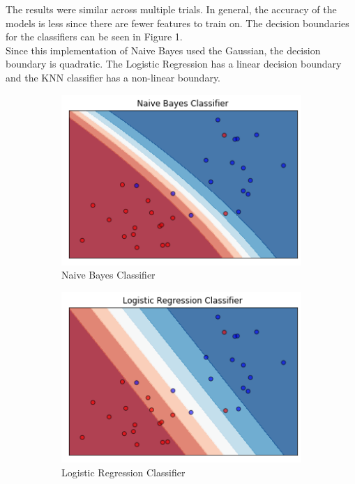 \documentclass[twoside,10pt]{article}
\begin{document}
\begin{enumerate}
\begin{enumerate}
\begin{itemize}
	The results were similar across multiple trials. In general, the accuracy of the models is less since there are fewer features to train on. The decision boundaries for the classifiers can be seen in Figure 1.\\
	Since this implementation of Naive Bayes used the Gaussian, the decision boundary is quadratic. The Logistic Regression has a linear decision boundary and the KNN classifier has a non-linear boundary.
	
\begin{figure}
\begin{subfigure}{.3\textwidth}
  \centering
  \includegraphics[width=.8\linewidth]{NBDecisionBoundary.png}
  \caption{Naive Bayes Classifier}
  \label{fig:sfig1}
\end{subfigure}%
\begin{subfigure}{.3\textwidth}
  \centering
  \includegraphics[width=.8\linewidth]{LRDecisionBoundary.png}
  \caption{Logistic Regression Classifier}
  \label{fig:sfig2}
\end{subfigure}
\begin{subfigure}{.3\textwidth}

\end{subfigure}
\end{figure}
\end{itemize}
\end{enumerate}
\end{enumerate}
\end{document}
